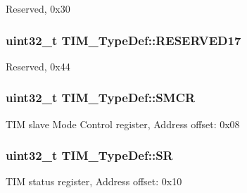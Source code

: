 Reserved, 0x30 \hypertarget{struct_t_i_m___type_def_a4f1ca99eb41a95117de38bb0c66808f3}{
\subsubsection[{R\-E\-S\-E\-R\-V\-E\-D17}]{\setlength{\rightskip}{0pt plus 5cm}uint32\-\_\-t T\-I\-M\-\_\-\-Type\-Def\-::\-R\-E\-S\-E\-R\-V\-E\-D17}}\label{struct_t_i_m___type_def_a4f1ca99eb41a95117de38bb0c66808f3}
Reserved, 0x44 \hypertarget{struct_t_i_m___type_def_a67d30593bcb68b98186ebe5bc8dc34b1}{
\subsubsection[{S\-M\-C\-R}]{ uint32\-\_\-t T\-I\-M\-\_\-\-Type\-Def\-::\-S\-M\-C\-R}}\label{struct_t_i_m___type_def_a67d30593bcb68b98186ebe5bc8dc34b1}
T\-I\-M slave Mode Control register, Address offset\-: 0x08 \hypertarget{struct_t_i_m___type_def_acedfc978c879835c05ef1788ad26b2ff}{
\subsubsection[{S\-R}]{ uint32\-\_\-t T\-I\-M\-\_\-\-Type\-Def\-::\-S\-R}}\label{struct_t_i_m___type_def_acedfc978c879835c05ef1788ad26b2ff}
T\-I\-M status register, Address offset\-: 0x10 

